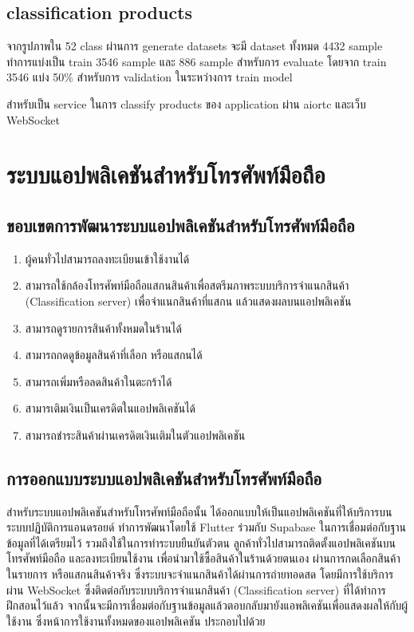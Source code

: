 \subsection{classification products}
จากรูปภาพใน 52 class ผ่านการ generate datasets จะมี dataset ทั้งหมด 4432 sample
ทำการแบ่งเป็น train 3546 sample และ  886 sample สำหรับการ evaluate
โดยจาก train 3546 แบ่ง 50\% สำหรับการ validation ในระหว่างการ train model

สำหรับเป็น service ในการ classify products ของ application ผ่าน aiortc  และเว็บ WebSocket



\newpage

\section{ระบบแอปพลิเคชันสำหรับโทรศัพท์มือถือ}
\subsection{ขอบเขตการพัฒนาระบบแอปพลิเคชันสำหรับโทรศัพท์มือถือ}
\begin{enumerate}
  \item ผู้คนทั่วไปสามารถลงทะเบียนเข้าใช้งานได้
  \item สามารถใช้กล้องโทรศัพท์มือถือแสกนสินค้าเพื่อสตรีมภาพระบบบริการจำแนกสินค้า (Classification server) เพื่อจำแนกสินค้าที่แสกน แล้วแสดงผลบนแอปพลิเคชัน
  \item สามารถดูรายการสินค้าทั้งหมดในร้านได้
  \item สามารถกดดูข้อมูลสินค้าที่เลือก หรือแสกนได้
  \item สามารถเพิ่มหรือลดสินค้าในตะกร้าได้
  \item สามารเติมเงินเป็นเครดิตในแอปพลิเคชันได้
  \item สามารถชําระสินค้าผ่านเครดิตเงินเติมในตัวแอปพลิเคชัน

\end{enumerate}

\subsection{การออกแบบระบบแอปพลิเคชันสำหรับโทรศัพท์มือถือ}
สำหรับระบบแอปพลิเคชันสำหรับโทรศัพท์มือถือนั้น ได้ออกแบบให้เป็นแอปพลิเคชันที่ให้บริการบนระบบปฏิบัติการแอนดรอยด์ ทำการพัฒนาโดยใช้ Flutter ร่วมกับ Supabase ในการเชื่อมต่อกับฐานข้อมูลที่ได้เตรียมไว้ รวมถึงใช้ในการทำระบบยืนยันตัวตน ลูกค้าทั่วไปสามารถติดตั้งแอปพลิเคชันบนโทรศัพท์มือถือ และลงทะเบียนใช้งาน เพื่อนำมาใช้ซื้อสินค้าในร้านด้วยตนเอง ผ่านการกดเลือกสินค้าในรายการ หรือแสกนสินค้าจริง ซึ่งระบบจะจำแนกสินค้าได้ผ่านการถ่ายทอดสด โดยมีการใช้บริการผ่าน WebSocket ซึ่งติดต่อกับระบบบริการจำแนกสินค้า (Classification server) ที่ได้ทำการฝึกสอนไว้แล้ว จากนั้นจะมีการเชื่อมต่อกับฐานข้อมูลแล้วตอบกลับมายังแอพลิเคชันเพื่อแสดงผลให้กับผู้ใช้งาน ซึ่งหน้าการใช้งานทั้งหมดของแอปพลิเคชัน ประกอบไปด้วย


